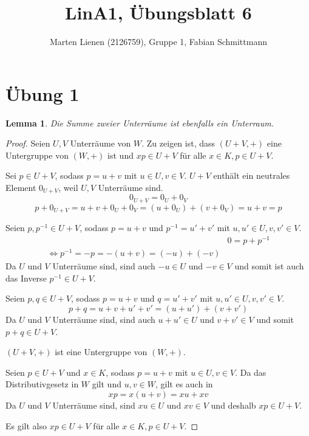 \documentclass[a4paper,10pt]{article}
\title{LinA1, Übungsblatt 6}
\author{Marten Lienen (2126759), Gruppe 1, Fabian Schmittmann}
\newtheorem{lemma}{Lemma}
\begin{document}
\maketitle

\section*{Übung 1}

\begin{lemma}
 Die Summe zweier Unterräume ist ebenfalls ein Unterraum.
\end{lemma}

\begin{proof}
 Seien $U, V$ Unterräume von $W$.
 Zu zeigen ist, dass $(U + V, +)$ eine Untergruppe von $(W, +)$ ist und $xp \in U + V$ für alle $x \in K, p \in U + V$.
 
 Sei $p \in U + V$, sodass $p = u + v$ mit $u \in U, v \in V$.
 $U + V$ enthält ein neutrales Element $0_{U + V}$, weil $U, V$ Unterräume sind.
 \begin{equation}
  0_{U + V} = 0_U + 0_V
 \end{equation}
 \begin{equation}
  p + 0_{U + V} = u + v + 0_U + 0_V = (u + 0_U) + (v + 0_V) = u + v = p
 \end{equation}
 
 Seien $p, p^{-1} \in U + V$, sodass $p = u + v$ und $p^{-1} = u' + v'$ mit $u, u' \in U, v, v' \in V$.
 \begin{align}
  & 0 = p + p^{-1}\\
  \Leftrightarrow p^{-1} = -p = -(u + v) = (-u) + (-v)
 \end{align}
 Da $U$ und $V$ Unterräume sind, sind auch $-u \in U$ und $-v \in V$ und somit ist auch das Inverse $p^{-1} \in U + V$.
 
 Seien $p, q \in U + V$, sodass $p = u + v$ und $q = u' + v'$ mit $u, u' \in U, v, v' \in V$.
 \begin{equation}
  p + q = u + v + u' + v' = (u + u') + (v + v')
 \end{equation}
 Da $U$ und $V$ Unterräume sind, sind auch $u + u' \in U$ und $v + v' \in V$ und somit $p + q \in U + V$.
 
 $(U + V, +)$ ist eine Untergruppe von $(W, +)$.
 
 Seien $p \in U + V$ und $x \in K$, sodass $p = u + v$ mit $u \in U, v \in V$.
 Da das Distributivgesetz in $W$ gilt und $u, v \in W$, gilt es auch in
 \begin{equation}
  xp = x(u + v) = xu + xv
 \end{equation}
 Da $U$ und $V$ Unterräume sind, sind $xu \in U$ und $xv \in V$ und deshalb $xp \in U + V$.
 
 Es gilt also $xp \in U + V$ für alle $x \in K, p \in U + V$.
\end{proof}
\end{document}
